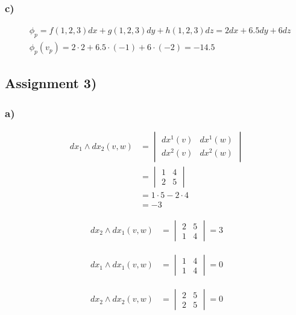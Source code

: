 \documentclass{article}
\begin{document}
\subsubsection*{c)}
\begin{align*}
	&\phi_p = f(1,2,3)dx + g(1,2,3)dy + h(1,2,3)dz = 2dx + 6.5dy + 6dz\\
	&\phi_p(v_p) = 2 \cdot 2 + 6.5 \cdot (-1) + 6 \cdot (-2) = -14.5
\end{align*}

\subsection*{Assignment 3)}
\subsubsection*{a)}

\begin{align*}
	dx_1 \wedge dx_2(v, w) &= \begin{vmatrix} dx^1(v) & dx^1(w) \\ dx^2(v) & dx^2(w) \end{vmatrix}\\
	&= \begin{vmatrix} 1 & 4 \\ 2 & 5 \end{vmatrix}\\
	&= 1 \cdot 5 - 2 \cdot 4\\
	&= -3
\end{align*}

\begin{align*}
	dx_2 \wedge dx_1(v, w) &= \begin{vmatrix} 2 & 5 \\ 1 & 4 \end{vmatrix} = 3
\end{align*}

\begin{align*}
	dx_1 \wedge dx_1(v, w) &= \begin{vmatrix} 1 & 4 \\ 1 & 4 \end{vmatrix} = 0
\end{align*}

\begin{align*}
	dx_2 \wedge dx_2(v, w) &= \begin{vmatrix} 2 & 5 \\ 2 & 5 \end{vmatrix} = 0
\end{align*}
\end{document}
